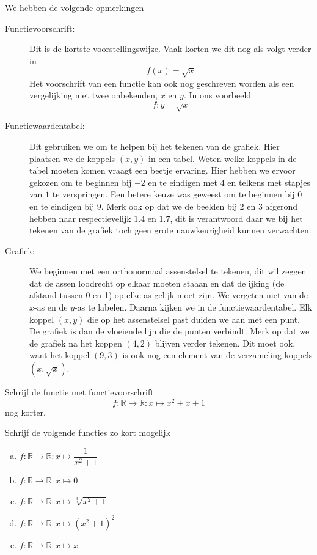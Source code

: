 \documentclass[12pt,twoside]{article}
\begin{document}
\begin{theorie}
We hebben de volgende opmerkingen
\begin{description}
\item[Functievoorschrift:] Dit is de kortste voorstellingswijze. Vaak korten we dit nog als volgt verder in
  $$f(x)=\sqrt{x}$$
  Het voorschrift van een functie kan ook nog geschreven worden als een vergelijking met twee onbekenden, $x$ en $y$. In ons voorbeeld
  $$f: y=\sqrt{x}$$
\item[Functiewaardentabel:] Dit gebruiken we om te helpen bij het tekenen van de grafiek. Hier plaatsen we de koppels $(x,y)$ in een tabel. Weten welke koppels in de tabel moeten komen vraagt een beetje ervaring. Hier hebben we ervoor gekozen om te beginnen bij $-2$ en te eindigen met $4$ en telkens met stapjes van $1$ te verspringen. Een betere keuze was geweest om te beginnen bij $0$ en te eindigen bij $9$. Merk ook op dat we de beelden bij $2$ en $3$ afgerond hebben naar respectievelijk $1.4$ en $1.7$, dit is verantwoord daar we bij het tekenen van de grafiek toch geen grote nauwkeurigheid kunnen verwachten.
\item[Grafiek:] We beginnen met een orthonormaal assenstelsel te tekenen, dit wil zeggen dat de assen loodrecht op elkaar moeten staaan en dat de ijking (de afstand tussen 0 en 1) op elke as gelijk moet zijn. We vergeten niet van de $x$-as en de $y$-as te labelen. Daarna kijken we in de functiewaardentabel. Elk koppel $(x,y)$ die op het assenstelsel past duiden we aan met een punt. De grafiek is dan de vloeiende lijn die de punten verbindt. Merk op dat we de grafiek na het koppen $(4,2)$ blijven verder tekenen. Dit moet ook, want het koppel $(9,3)$ is ook nog een element van de verzameling koppels $(x,\sqrt{x})$.
\end{description}

\end{theorie}

\begin{oefening}
  Schrijf de functie met functievoorschrift
  $$f:\mathbb{R}\to\mathbb{R}:x\mapsto x^2+x+1$$
  nog korter.
\end{oefening}

\begin{oefening}
  Schrijf de volgende functies zo kort mogelijk
  \begin{enumerate}[(a)]
  \item $f:\mathbb{R}\to\mathbb{R}:x\mapsto \dfrac{1}{x^2+1}$
  \item $f:\mathbb{R}\to\mathbb{R}:x\mapsto 0$
  \item $f:\mathbb{R}\to\mathbb{R}:x\mapsto \sqrt[3]{x^2+1}$
  \item $f:\mathbb{R}\to\mathbb{R}:x\mapsto \left(x^2+1\right)^2$
  \item $f:\mathbb{R}\to\mathbb{R}:x\mapsto x$
  \end{enumerate}
\end{oefening}
\end{document}
